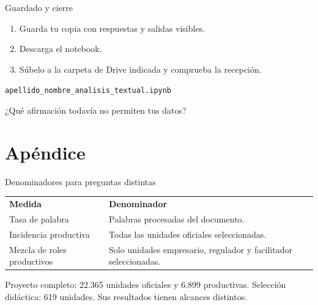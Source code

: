 \begin{frame}[label=cierre]{Guardado y cierre}
\begin{enumerate}
    \item Guarda tu copia con respuestas y salidas visibles.
    \item Descarga el notebook.
    \item Súbelo a la carpeta de Drive indicada y comprueba la recepción.
  \end{enumerate}
  \par\vspace{0.3cm}
  {\small\texttt{apellido\_nombre\_analisis\_textual.ipynb}\par}
  \par\vspace{0.5cm}
  ¿Qué afirmación todavía no permiten tus datos?
\end{frame}

\appendix
\section*{Apéndice}

\begin{frame}[label=denominadores]{Denominadores para preguntas distintas}
  \renewcommand{\arraystretch}{1.35}
  \begin{tabular}{@{}p{}p{}@{}}
    \textbf{Medida} & \textbf{Denominador}\\
    Tasa de palabra & Palabras procesadas del documento.\\
    Incidencia productiva & Todas las unidades oficiales seleccionadas.\\
    Mezcla de roles productivos & Solo unidades empresario, regulador y facilitador seleccionadas.\\
  \end{tabular}\par
  \par\vspace{0.3cm}
  Proyecto completo: 22.365 unidades oficiales y 6.899 productivas. Selección didáctica: 619 unidades. Sus resultados tienen alcances distintos.
\end{frame}

